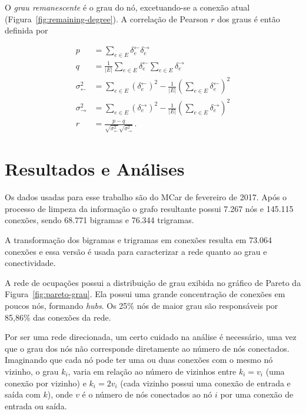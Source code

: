 \documentclass[
  article,
  11pt,
  a4paper,
  english,
  brazil,
  sumario=tradicional]{abntex2}
\begin{document}
O \textit{grau remanescente} é o grau do nó, excetuando-se a conexão atual (Figura~\ref{fig:remaining-degree}). A correlação de Pearson $r$ dos graus é então definida por

\begin{align*}
p &= \sum_{e \in E} \delta_e^\leftarrow \delta_e^\rightarrow
\\
q &= \frac{1}{|E|} \sum_{e \in E} \delta_e^\leftarrow
                                  \sum_{e \in E }\delta_e^\rightarrow
\\
\sigma^2_\leftarrow &= \sum_{e \in E} \left( \delta_e^\leftarrow \right)^2
            - \frac{1}{|E|} \left( \sum_{e \in E} \delta_e^\leftarrow \right)^2
\\
\sigma^2_\rightarrow &= \sum_{e \in E} \left( \delta_e^\rightarrow \right)^2
           - \frac{1}{|E|} \left( \sum_{e \in E} \delta_e^\rightarrow \right)^2
\\
r &= \frac{p - q}
                {\sqrt{ \sigma^2_\leftarrow } \sqrt{ \sigma^2_\rightarrow }}\,.
\end{align*}


\section{Resultados e Análises} \label{sec:resultados}


Os dados usadas para esse trabalho são do MCar de fevereiro de 2017. Após o processo de limpeza da informação o grafo resultante possui 7.267 nós e 145.115 conexões, sendo 68.771 bigramas e 76.344 trigramas.

A transformação dos bigramas e trigramas em conexões resulta em 73.064 conexões e essa versão é usada para caracterizar a rede quanto ao grau e conectividade.

A rede de ocupações possui a distribuição de grau exibida no gráfico de Pareto da Figura~\ref{fig:pareto-grau}. Ela possui uma grande concentração de conexões em poucos nós, formando \textit{hubs}. Os 25\% nós de maior grau são responsáveis por 85,86\% das conexões da rede.

Por ser uma rede direcionada, um certo cuidado na análise é necessário, uma vez que o grau dos nós não corresponde diretamente ao número de nós conectados. Imaginando que cada nó pode ter uma ou duas conexões com o mesmo nó vizinho, o grau $k_i$, varia em relação ao número de vizinhos entre $k_i = v_i$ (uma conexão por vizinho) e $k_i = 2v_i$ (cada vizinho possui uma conexão de entrada e saída com $k$), onde $v$ é o número de nós conectados ao nó $i$ por uma conexão de entrada ou saída.
\end{document}
